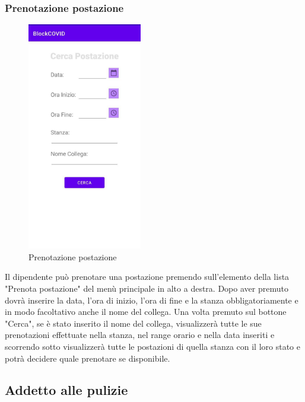 \subsubsection{Prenotazione postazione}
\begin{figure}[H]
	\centering
	\includegraphics[width=5cm]{res/images/PrenotaPostazione.png}
	\caption{Prenotazione postazione}
\end{figure}
Il dipendente può prenotare una postazione premendo sull'elemento della lista "Prenota postazione" del menù principale in alto a destra.
Dopo aver premuto dovrà inserire la data, l'ora di inizio, l'ora di fine e la stanza obbligatoriamente e in modo facoltativo anche il nome del collega.
Una volta premuto sul bottone "Cerca", se è stato inserito il nome del collega, visualizzerà tutte le sue prenotazioni effettuate nella stanza, nel range orario e nella data inseriti e scorrendo sotto visualizzerà tutte le postazioni di quella stanza con il loro stato e potrà decidere quale prenotare se disponibile. 



\subsection{Addetto alle pulizie}